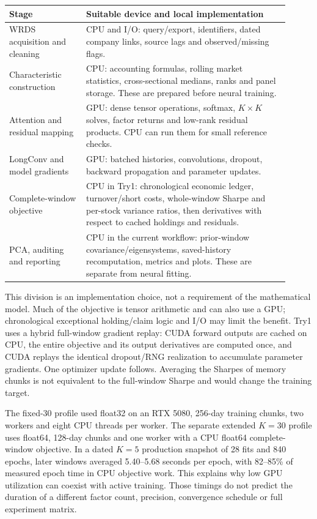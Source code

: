 \documentclass[11pt]{article}
\begin{document}
\begin{center}
\begin{tabular}{p{0.25\linewidth}p{0.66\linewidth}}
\hline
Stage & Suitable device and local implementation \\
\hline
WRDS acquisition and cleaning & CPU and I/O: query/export, identifiers,
dated company links, source lags and observed/missing flags. \\
Characteristic construction & CPU: accounting formulas, rolling market
statistics, cross-sectional medians, ranks and panel storage. These are
prepared before neural training. \\
Attention and residual mapping & GPU: dense tensor operations, softmax,
$K\times K$ solves, factor returns and low-rank residual products. CPU
can run them for small reference checks. \\
LongConv and model gradients & GPU: batched histories, convolutions,
dropout, backward propagation and parameter updates. \\
Complete-window objective & CPU in Try1: chronological economic ledger,
turnover/short costs, whole-window Sharpe and per-stock variance ratios,
then derivatives with respect to cached holdings and residuals. \\
PCA, auditing and reporting & CPU in the current workflow: prior-window
covariance/eigensystems, saved-history recomputation, metrics and plots.
These are separate from neural fitting. \\
\hline
\end{tabular}
\end{center}

This division is an implementation choice, not a requirement of the
mathematical model. Much of the objective is tensor arithmetic and can
also use a GPU; chronological exceptional holding/claim logic and I/O
may limit the benefit. Try1 uses a hybrid full-window gradient replay:
CUDA forward outputs are cached on CPU, the entire objective and its
output derivatives are computed once, and CUDA replays the identical
dropout/RNG realization to accumulate parameter gradients. One optimizer
update follows. Averaging the Sharpes of memory chunks is not equivalent
to the full-window Sharpe and would change the training target.

The fixed-30 profile used float32 on an RTX 5080, 256-day training chunks,
two workers and eight CPU threads per worker. The separate extended
$K=30$ profile uses float64, 128-day chunks and one worker with a CPU
float64 complete-window objective. In a dated $K=5$ production snapshot
of 28 fits and 840 epochs, later windows averaged 5.40--5.68 seconds per
epoch, with 82--85\% of measured epoch time in CPU objective work. This
explains why low GPU utilization can coexist with active training. Those
timings do not predict the duration of a different factor count,
precision, convergence schedule or full experiment matrix.
\end{document}
